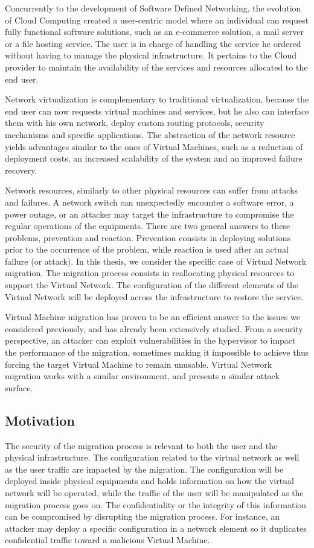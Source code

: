 Concurrently to the development of Software Defined Networking, the evolution of Cloud Computing created a user-centric model where an individual can request fully functional software solutions, such as an e-commerce solution, a mail server or a file hosting service. The user is in charge of handling the service he ordered without having to manage the physical infrastructure.
It pertains to the Cloud provider to maintain the availability of the services and resources allocated to the end user.

Network virtualization is complementary to traditional virtualization, because the end user can now requests virtual machines and services, but he also can interface them with his own network, deploy custom routing protocols, security mechanisms and specific applications. The abstraction of the network resource yields advantages similar to the ones of Virtual Machines, such as a reduction of deployment costs, an increased scalability of the system and an improved failure recovery.

Network resources, similarly to other physical resources can suffer from attacks and failures. A network switch can unexpectedly encounter a software error, a power outage, or an attacker may target the infrastructure to compromise the regular operations of the equipments. There are two general answers to these problems, prevention and reaction. Prevention consists in deploying solutions prior to the occurrence of the problem, while reaction is used after an actual failure (or attack).
In this thesis, we consider the specific case of Virtual Network migration.
The migration process consists in reallocating physical resources to support the Virtual Network.
The configuration of the different elements of the Virtual Network will be deployed across the infrastructure to restore the service.

Virtual Machine migration has proven to be an efficient answer to the issues we considered previously, and has already been extensively studied. From a security perspective, an attacker can exploit vulnerabilities in the hypervisor to impact the performance of the migration, sometimes making it impossible to achieve thus forcing the target Virtual Machine to remain unusable.
Virtual Network migration works with a similar environment, and presents a similar attack surface.


\subsection{Motivation}
The security of the migration process is relevant to both the user and the physical infrastructure.
The configuration related to the virtual network as well as the user traffic are impacted by the migration. The configuration will be deployed inside physical equipments and holds information on how the virtual network will be operated, while the traffic of the user will be manipulated as the migration process goes on.
The confidentiality or the integrity of this information can be compromised by disrupting the migration process. For instance,  an attacker may deploy a specific configuration in a network element so it duplicates confidential traffic toward a malicious Virtual Machine.

